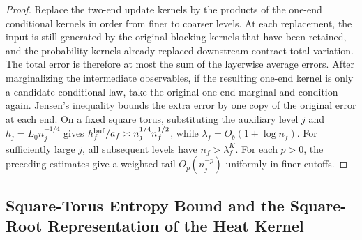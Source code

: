 \documentclass[11pt,a4paper]{article}
\numberwithin{equation}{section}
\begin{document}
\begin{proof}
Replace the two-end update kernels by the products of the one-end conditional kernels in order from finer to coarser levels. At each replacement, the input is still generated by the original blocking kernels that have been retained, and the probability kernels already replaced downstream contract total variation. The total error is therefore at most the sum of the layerwise average errors. After marginalizing the intermediate observables, if the resulting one-end kernel is only a candidate conditional law, take the original one-end marginal and condition again. Jensen's inequality bounds the extra error by one copy of the original error at each end. On a fixed square torus, substituting the auxiliary level \(j\) and \(h_j=L_0n_j^{-1/4}\) gives \(h_f^{\rm buf}/a_f\asymp n_j^{1/4}n_f^{1/2}\), while \(\lambda_f=O_b(1+\log n_f)\). For sufficiently large \(j\), all subsequent levels have \(n_f>\lambda_f^K\). For each \(p>0\), the preceding estimates give a weighted tail \(O_p(n_j^{-p})\) uniformly in finer cutoffs.
\end{proof}

\subsection{Square-Torus Entropy Bound and the Square-Root Representation of the Heat Kernel}
\end{document}
